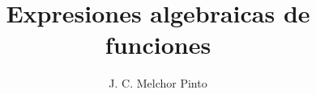 \documentclass[12pt]{guia}
\title{Expresiones algebraicas de funciones}
\author{J. C. Melchor Pinto}
\begin{document}
\pagestyle{headandfoot}
\addpoints
\INFO
\vspace{-1cm}
\begin{multicols}{2}
    
    \columnbreak
    
    
    
\end{multicols}

\begin{questions}
    \questionboxed[20] 
    \questionboxed[20] 
    \questionboxed[20] 
    \questionboxed[20] 
    \questionboxed[20] 
\end{questions}
\end{document}
